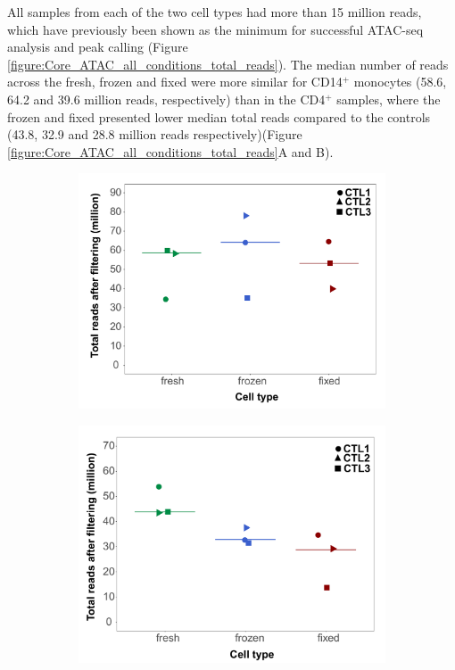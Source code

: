 All samples from each of the two cell types had more than 15 million reads, which have previously been shown as the minimum for successful ATAC-seq analysis and peak calling (Figure \ref{figure:Core_ATAC_all_conditions_total_reads}). The median number of reads across the fresh, frozen and fixed were more similar for CD14$^+$ monocytes (58.6, 64.2 and 39.6 million reads, respectively) than in the CD4$^+$ samples, where the frozen and fixed presented lower median total reads compared to the controls (43.8, 32.9 and 28.8 million reads respectively)(Figure \ref{figure:Core_ATAC_all_conditions_total_reads}A and B).

\begin{figure}[htbp]
\centering
\begin{subfigure}{0.5\textwidth}
\centering
\includegraphics[width=\textwidth]{./Results1/pdfs/Core_ATAC_CD14_fresh_frozen_fixed_filtered_total_reads}
\caption{\textbf{}}
\end{subfigure}%
\begin{subfigure}{0.5\textwidth}
\centering
\includegraphics[width=\textwidth]{./Results1/pdfs/Core_ATAC_CD4_fresh_frozen_fixed_filtered_total_reads}

\end{subfigure}
\end{figure}
